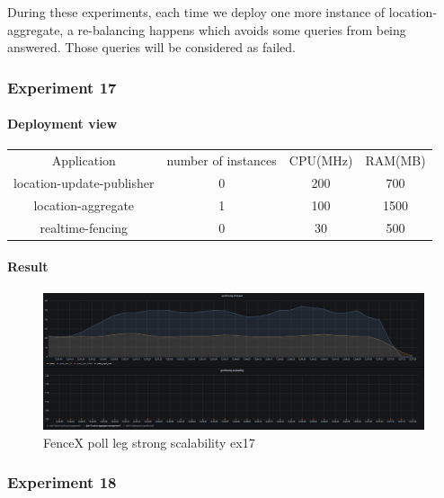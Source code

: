\documentclass[a4]{report}
\begin{document}
    During these experiments, each time we deploy one more instance of location-aggregate, a re-balancing happens which
    avoids some queries from being answered.
    Those queries will be considered as failed.

    \subsubsection{Experiment 17}

    \paragraph{Deployment view}
    \begin{center}
        \begin{tabular}{ c c c c }
            Application               & number of instances & CPU(MHz) & RAM(MB) \\
            location-update-publisher & 0                   & 200      & 700     \\
            location-aggregate        & 1                   & 100      & 1500    \\
            realtime-fencing          & 0                   & 30       & 500     \\
        \end{tabular}
    \end{center}

    \paragraph{Result}
    \begin{figure}[ht]
        \caption{FenceX poll leg strong scalability ex17}
        \label{fig:ex17}
        \includegraphics[scale=0.4]{images/evaluation/ex17-benchmarking-ongoing-2per4sec.png}
    \end{figure}

    \subsubsection{Experiment 18}
\end{document}
